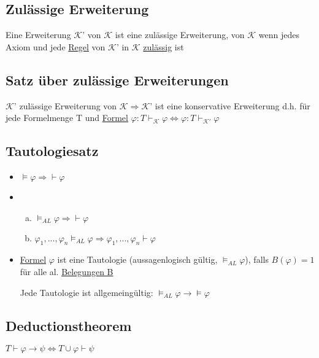 \documentclass[12pt,a4paper]{article} %
\begin{document}
	\subsection{Zulässige Erweiterung}
	Eine Erweiterung $\mathcal{K}$' von $\mathcal{K}$ ist eine zulässige Erweiterung, von $\mathcal{K}$ wenn jedes Axiom und jede \hyperref[Kalkul]{Regel} von $\mathcal{K}$' in $\mathcal{K}$ \hyperref[Zulassig]{zulässig} ist
	
	\subsection{Satz über zulässige Erweiterungen}
	$\mathcal{K}$' zulässige Erweiterung von $\mathcal{K} \Rightarrow \mathcal{K}$' ist eine konservative Erweiterung d.h. für jede Formelmenge T und \hyperref[Formel]{Formel} $\varphi: T \hyperref[Beweisbar]{\vdash_{\mathcal{K}}} \varphi \Leftrightarrow \varphi: T \hyperref[Beweisbar]{\vdash_{\mathcal{K}'}} \varphi$
	
	\subsection{Tautologiesatz}
	\begin{itemize}
		\item $\hyperref[Erfullbar]{\vDash} \varphi \Rightarrow \hyperref[Beweisbar]{\vdash} \varphi$
		\item \begin{enumerate}[(a)]
			\item $\vDash_{AL} \varphi \Rightarrow \hyperref[Beweisbar]{\vdash} \varphi$ 
			\item $\varphi_1, ..., \varphi_n \vDash_{AL} \varphi \Rightarrow \varphi_1, ..., \varphi_n \hyperref[Beweisbar]{\vdash} \varphi$
		\end{enumerate}
		\item \hyperref[Formel]{Formel} $\varphi$ ist eine Tautologie (aussagenlogisch gültig, $\hyperref[Erfullbar]{\vDash_{AL}} \varphi$), falls $B(\varphi) = 1$ für alle al. \hyperref[Belegung]{Belegungen B}
		
		Jede Tautologie ist allgemeingültig: $\hyperref[Erfullbar]{\vDash_{AL}} \varphi \rightarrow \hyperref[Erfullbar]{\vDash} \varphi$
	\end{itemize}
	
	\subsection{Deductionstheorem}
	$T \hyperref[Beweisbar]{\vdash} \varphi \rightarrow \psi \Leftrightarrow T \cup \varphi \hyperref[Beweisbar]{\vdash} \psi$
	
\end{document}
